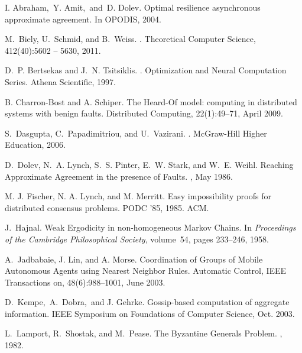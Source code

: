 \documentclass{llncs}
\begin{document}
\begin{thebibliography}{10}
I. Abraham,~Y. Amit,~and~D. Dolev. 
\newblock Optimal resilience asynchronous approximate agreement. 
\newblock In OPODIS, 2004.



M.~Biely, U.~Schmid, and B.~Weiss. 
. \newblock Theoretical Computer Science, 412(40):5602 – 5630, 2011.

D.~P. Bertsekas and J.~N. Tsitsiklis.
.
\newblock Optimization and Neural Computation Series. Athena Scientific, 1997.

B. Charron-Bost and A. Schiper. 
\newblock The Heard-Of model: computing in distributed systems with benign faults.
\newblock Distributed Computing, 22(1):49–71, April 2009.

S.~Dasgupta, C.~Papadimitriou, and U.~Vazirani.
.
\newblock McGraw-Hill Higher Education, 2006.

D.~Dolev, N.~A. Lynch, S.~S. Pinter, E.~W. Stark, and W.~E. Weihl.
\newblock Reaching Approximate Agreement in the presence of Faults.
, May 1986.

M. J. Fischer, N. A. Lynch, and M. Merritt. 
\newblock Easy impossibility proofs for distributed consensus problems.
\newblock PODC '85, 1985. ACM.

J.~Hajnal.
\newblock Weak Ergodicity in non-homogeneous Markov Chains.
\newblock In {\em Proceedings of the Cambridge Philosophical Society},
  volume~54, pages 233--246, 1958.

A.~Jadbabaie, J. Lin, and A. Morse. 
\newblock Coordination of Groups of Mobile Autonomous Agents using Nearest Neighbor Rules. 
\newblock Automatic Control, IEEE Transactions on, 48(6):988--1001, June 2003.


D.~Kempe,~A.~Dobra,~and J. Gehrke.
\newblock Gossip-based computation of aggregate information.
\newblock IEEE Symposium on Foundations of Computer Science, Oct. 2003.

L.~Lamport, R.~Shostak, and M.~Pease.
\newblock The Byzantine Generals Problem.
, 1982.


\end{thebibliography}
\end{document}
